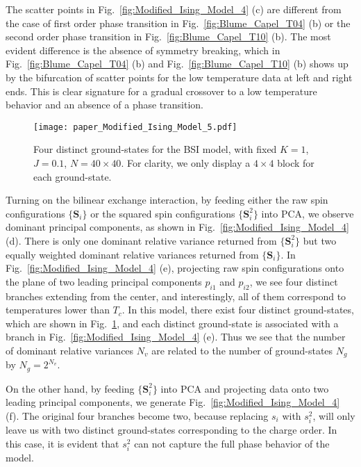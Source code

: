 \documentclass[pra,letterpaper,10pt,twocolumn]{revtex4}
\begin{document}
The scatter points in Fig.~\ref{fig:Modified_Ising_Model_4} (c) are
different from the case of first order phase transition in
Fig.~\ref{fig:Blume_Capel_T04} (b) or the second order phase transition
in Fig.~\ref{fig:Blume_Capel_T10} (b).  The most evident difference is
the absence of symmetry breaking, which in
Fig.~\ref{fig:Blume_Capel_T04} (b) and Fig.~\ref{fig:Blume_Capel_T10}
(b) shows up by the bifurcation of scatter points for the low
temperature data at left and right ends. This is clear signature for a
gradual crossover to a low temperature behavior and an absence of a
phase transition.

\begin{figure}[!h]
\texttt{[image: paper\_Modified\_Ising\_Model\_5.pdf]}  
\caption{
Four distinct ground-states for the BSI model, with fixed $K=1$,
$J=0.1$, $N=40\times 40$. For clarity, we only display a $4\times 4$ block
for each ground-state.
\label{fig:Modified_Ising_Model_5}
}
\end{figure}

Turning on the bilinear exchange interaction, by feeding either the raw
spin configurations $\{\mathbf{S}_i\}$ or the squared spin
configurations $\{\mathbf{S}^2_i\}$ into PCA, we observe dominant
principal components, as shown in
Fig.~\ref{fig:Modified_Ising_Model_4} (d). There is only one
dominant relative variance returned from $\{\mathbf{S}^2_i\}$ but two equally weighted dominant relative variances returned from $\{\mathbf{S}_i\}$. 
In Fig.~\ref{fig:Modified_Ising_Model_4} (e), projecting raw spin
configurations onto the plane of two leading principal components
$p_{i1}$ and $p_{i2}$, we see four distinct branches extending from the
center, and interestingly, all of them correspond to temperatures lower
than $T_c$. In this model, there exist four distinct ground-states, which are
shown in Fig.~\ref{fig:Modified_Ising_Model_5}, and each
distinct ground-state is associated with a branch in
Fig.~\ref{fig:Modified_Ising_Model_4} (e). 
Thus we see that the number of
dominant relative variances $N_{v}$ are related to the number of
ground-states $N_{g}$ by $N_{g}=2^{N_{v}}$.


On the other hand, by feeding $\{\mathbf{S}^2_i\}$ into PCA and
projecting data onto two leading principal components, we generate
Fig.~\ref{fig:Modified_Ising_Model_4} (f). The original four branches
become two, because replacing $s_i$ with $s_i^2$, will only leave us
with two distinct ground-states corresponding to the charge order. In
this case, it is evident that $s_i^2$ can not capture the full phase
behavior of the model.
\end{document}
